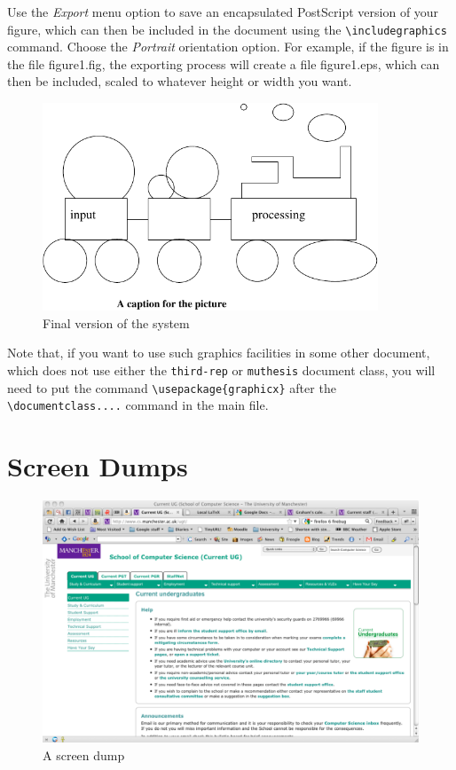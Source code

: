 Use the \emph{Export} menu option to save an encapsulated PostScript
version of your figure, which can then be included in the document
using the \verb=\includegraphics= command. Choose the \emph{Portrait}
orientation option. For example, if the figure is in the file \textsf{
  figure1.fig}, the exporting process will create a file \textsf{
  figure1.eps}, which can then be included, scaled to whatever height
or width you want.


\begin{figure}
\begin{center}
\includegraphics[width=10cm]{figure1} %
\end{center}
\caption{Final version of the system}
\label{fig:fig-eg}  
\end{figure}

Note that, if you want to use such graphics facilities in some other
document, which does not use either the \texttt{third-rep} or
\texttt{muthesis} document class, you will need to put the command
\verb=\usepackage{graphicx}= after the \verb=\documentclass....=
command in the main file.

\section{Screen Dumps}
\label{sec:screen-dumps}
\begin{figure}
\begin{center}
\includegraphics[width=12cm]{screen}
\end{center}
\caption{A screen dump}
\label{fig:scr-dump}
\end{figure}

